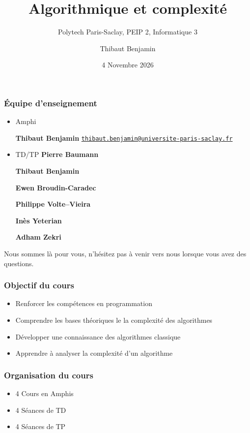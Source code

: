\documentclass[aspectratio=169]{beamer}
\title{Algorithmique et complexité}
\subtitle{Polytech Paris-Saclay, PEIP 2, Informatique 3}
\author{Thibaut Benjamin}
\date{4 Novembre 2026}
\institute{Amphi 1}
\begin{document}
\maketitle

\begin{frame}
  \frametitle{\'Equipe d'enseignement}

  \begin{itemize}
  \item Amphi

    \textbf{Thibaut Benjamin}
    \href{mailto:thibaut.benjamin@universite-paris-saclay.fr}
    {\texttt{thibaut.benjamin@universite-paris-saclay.fr}}

  \item TD/TP
     \textbf{Pierre Baumann}

    \textbf{Thibaut Benjamin}

    \textbf{Ewen Broudin-Caradec}

    \textbf{Philippe Volte--Vieira}

    \textbf{Inès Yeterian}

    \textbf{Adham Zekri}
  \end{itemize}

  \alert{Nous sommes là pour vous, n'hésitez pas à venir vers nous lorsque vous
    avez des questions.}

\end{frame}

\begin{frame}
  \frametitle{Objectif du cours}

  \begin{itemize}
  \item Renforcer les compétences en programmation \Cpp
  \item Comprendre les bases théoriques le la complexité des algorithmes
  \item Développer une connaissance des algorithmes classique
  \item Apprendre à analyser la complexité d'un algorithme
  \end{itemize}

\end{frame}

\begin{frame}
  \frametitle{Organisation du cours}

  \begin{itemize}
  \item 4 Cours en Amphis
  \item 4 Séances de TD
  \item 4 Séances de TP
  \end{itemize}

\end{frame}
\end{document}

